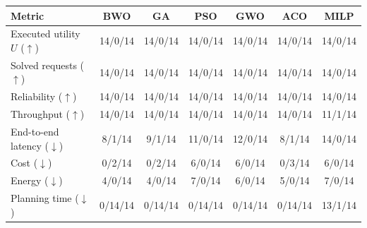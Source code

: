 \begin{tabular}{lcccccc}\toprule
Metric & BWO & GA & PSO & GWO & ACO & MILP\\\midrule
Executed utility $U$ ($\uparrow$) & 14/0/14 & 14/0/14 & 14/0/14 & 14/0/14 & 14/0/14 & 14/0/14\\
Solved requests ($\uparrow$) & 14/0/14 & 14/0/14 & 14/0/14 & 14/0/14 & 14/0/14 & 14/0/14\\
Reliability ($\uparrow$) & 14/0/14 & 14/0/14 & 14/0/14 & 14/0/14 & 14/0/14 & 14/0/14\\
Throughput ($\uparrow$) & 14/0/14 & 14/0/14 & 14/0/14 & 14/0/14 & 14/0/14 & 11/1/14\\
End-to-end latency ($\downarrow$) & 8/1/14 & 9/1/14 & 11/0/14 & 12/0/14 & 8/1/14 & 14/0/14\\
Cost ($\downarrow$) & 0/2/14 & 0/2/14 & 6/0/14 & 6/0/14 & 0/3/14 & 6/0/14\\
Energy ($\downarrow$) & 4/0/14 & 4/0/14 & 7/0/14 & 6/0/14 & 5/0/14 & 7/0/14\\
Planning time ($\downarrow$) & 0/14/14 & 0/14/14 & 0/14/14 & 0/14/14 & 0/14/14 & 13/1/14\\
\bottomrule
\end{tabular}